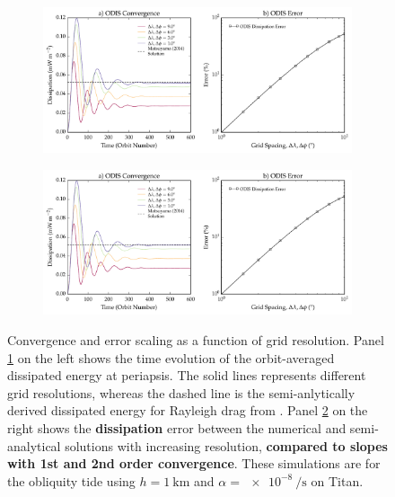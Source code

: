 \begin{figure}[!t]
    \centering
    \begin{subfigure}[t]{\linewidth} %
        \includegraphics[width=\linewidth]{Figures/convergence2}
        \label{fig:conv_a}
    \end{subfigure}
    \begin{subfigure}[t]{0\linewidth} %
         \includegraphics[width=\linewidth]{Figures/convergence2}
         \label{fig:conv_b}   
    \end{subfigure}
    \vspace{-0.5cm}
\caption{Convergence and error scaling as a function of grid resolution. Panel \ref{fig:conv_a} on the left shows the time evolution of the orbit-averaged dissipated energy at periapsis. The solid lines represents different grid resolutions, whereas the dashed line is the semi-anlytically derived dissipated energy for Rayleigh drag from \citet{matsuyama2014tidal}. Panel \ref{fig:conv_b} on the right shows the \textbf{dissipation} error between the numerical and semi-analytical solutions with increasing resolution,\textbf{ compared to slopes with 1st and 2nd order convergence}. These simulations are for the obliquity tide using $h = \SI{1}{\kilo\metre}$ and $\alpha = \SI{e-8}{\per\second}$ on Titan. \label{fig:conv}}
\end{figure}

